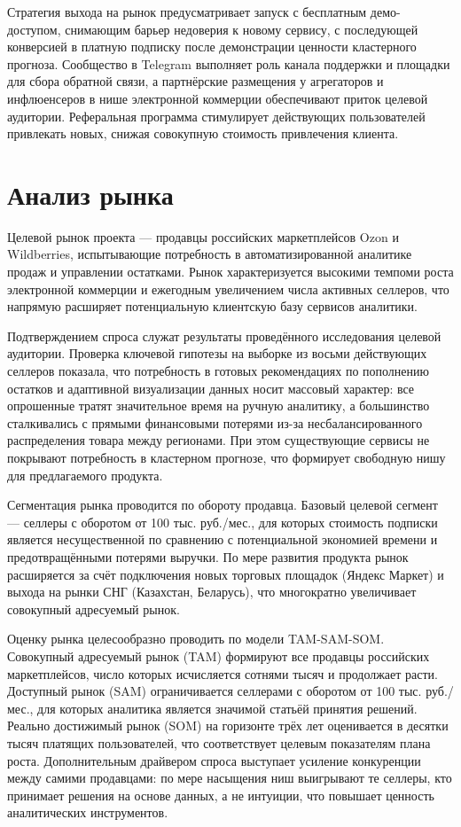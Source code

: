 Стратегия выхода на рынок предусматривает запуск с бесплатным демо-доступом, снимающим барьер недоверия к новому сервису, с последующей конверсией в платную подписку после демонстрации ценности кластерного прогноза. Сообщество в Telegram выполняет роль канала поддержки и площадки для сбора обратной связи, а партнёрские размещения у агрегаторов и инфлюенсеров в нише электронной коммерции обеспечивают приток целевой аудитории. Реферальная программа стимулирует действующих пользователей привлекать новых, снижая совокупную стоимость привлечения клиента.

\section{Анализ рынка}

Целевой рынок проекта --- продавцы российских маркетплейсов Ozon и Wildberries, испытывающие потребность в автоматизированной аналитике продаж и управлении остатками. Рынок характеризуется высокими темпоми роста электронной коммерции и ежегодным увеличением числа активных селлеров, что напрямую расширяет потенциальную клиентскую базу сервисов аналитики.

Подтверждением спроса служат результаты проведённого исследования целевой аудитории. Проверка ключевой гипотезы на выборке из восьми действующих селлеров показала, что потребность в готовых рекомендациях по пополнению остатков и адаптивной визуализации данных носит массовый характер: все опрошенные тратят значительное время на ручную аналитику, а большинство сталкивались с прямыми финансовыми потерями из-за несбалансированного распределения товара между регионами. При этом существующие сервисы не покрывают потребность в кластерном прогнозе, что формирует свободную нишу для предлагаемого продукта.

Сегментация рынка проводится по обороту продавца. Базовый целевой сегмент --- селлеры с оборотом от 100 тыс. руб./мес., для которых стоимость подписки является несущественной по сравнению с потенциальной экономией времени и предотвращёнными потерями выручки. По мере развития продукта рынок расширяется за счёт подключения новых торговых площадок (Яндекс Маркет) и выхода на рынки СНГ (Казахстан, Беларусь), что многократно увеличивает совокупный адресуемый рынок.

Оценку рынка целесообразно проводить по модели TAM-SAM-SOM. Совокупный адресуемый рынок (TAM) формируют все продавцы российских маркетплейсов, число которых исчисляется сотнями тысяч и продолжает расти. Доступный рынок (SAM) ограничивается селлерами с оборотом от 100 тыс. руб./мес., для которых аналитика является значимой статьёй принятия решений. Реально достижимый рынок (SOM) на горизонте трёх лет оценивается в десятки тысяч платящих пользователей, что соответствует целевым показателям плана роста. Дополнительным драйвером спроса выступает усиление конкуренции между самими продавцами: по мере насыщения ниш выигрывают те селлеры, кто принимает решения на основе данных, а не интуиции, что повышает ценность аналитических инструментов.

